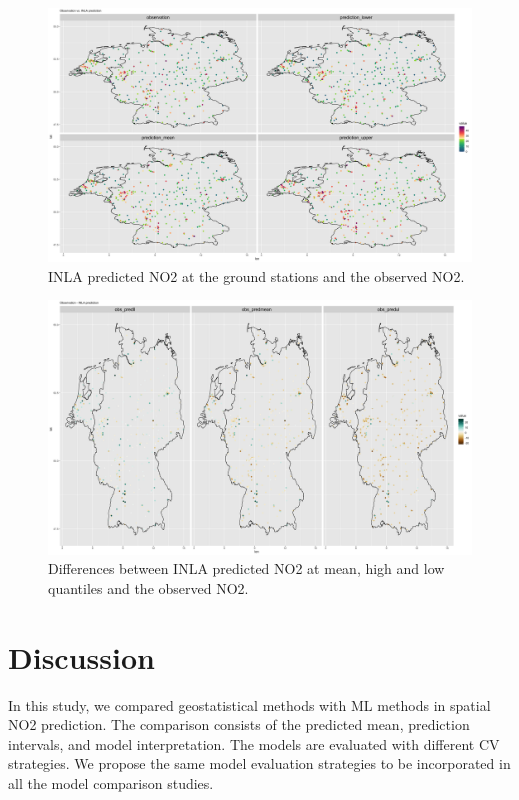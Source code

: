 \documentclass{article}
\begin{document}
\begin{figure}
\centering
\includegraphics[scale = 0.05]{fig/pred_11var.png}
\caption{INLA predicted NO2 at the ground stations and the observed NO2. }
\label{INLApred}
\end{figure}

\begin{figure}
\centering
\includegraphics[scale = 0.05]{fig/dif_obs_INLA_11var.png}
\caption{Differences between INLA predicted NO2 at mean, high and low quantiles and the observed NO2. }
\label{difINLA}
\end{figure}

\section{Discussion}
In this study, we compared geostatistical methods with ML methods in spatial NO2 prediction. The comparison consists of the predicted mean, prediction intervals, and model interpretation. The models are evaluated with different CV strategies. We propose the same model evaluation strategies to be incorporated in all the model comparison studies. 
\end{document}
